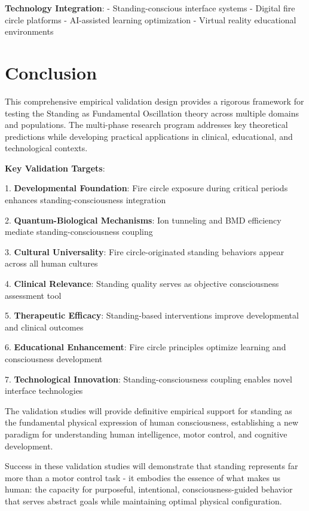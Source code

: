 \documentclass[12pt]{article}
\begin{document}
\textbf{Technology Integration}:
- Standing-conscious interface systems
- Digital fire circle platforms
- AI-assisted learning optimization
- Virtual reality educational environments

\section{Conclusion}

This comprehensive empirical validation design provides a rigorous framework for testing the Standing as Fundamental Oscillation theory across multiple domains and populations. The multi-phase research program addresses key theoretical predictions while developing practical applications in clinical, educational, and technological contexts.

\textbf{Key Validation Targets}:

1. \textbf{Developmental Foundation}: Fire circle exposure during critical periods enhances standing-consciousness integration

2. \textbf{Quantum-Biological Mechanisms}: Ion tunneling and BMD efficiency mediate standing-consciousness coupling

3. \textbf{Cultural Universality}: Fire circle-originated standing behaviors appear across all human cultures

4. \textbf{Clinical Relevance}: Standing quality serves as objective consciousness assessment tool

5. \textbf{Therapeutic Efficacy}: Standing-based interventions improve developmental and clinical outcomes

6. \textbf{Educational Enhancement}: Fire circle principles optimize learning and consciousness development

7. \textbf{Technological Innovation}: Standing-consciousness coupling enables novel interface technologies

The validation studies will provide definitive empirical support for standing as the fundamental physical expression of human consciousness, establishing a new paradigm for understanding human intelligence, motor control, and cognitive development.

Success in these validation studies will demonstrate that standing represents far more than a motor control task - it embodies the essence of what makes us human: the capacity for purposeful, intentional, consciousness-guided behavior that serves abstract goals while maintaining optimal physical configuration.



\end{document}
